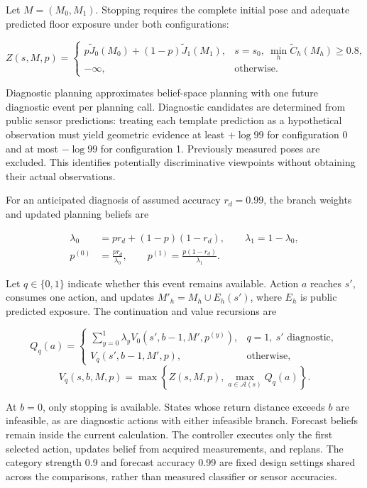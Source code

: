 \documentclass[11pt,a4paper]{article}
\begin{document}
Let \(M=(M_0,M_1)\). Stopping requires the complete initial pose and adequate predicted floor exposure under both configurations:

\[
Z(s,M,p)=
\begin{cases}
p\widetilde J_0(M_0)+(1-p)\widetilde J_1(M_1),
&s=s_0,\ \min_h\widetilde C_h(M_h)\ge0.8,\\
-\infty,&\text{otherwise}.
\end{cases}
\]

Diagnostic planning approximates belief-space planning \cite{ref12,ref13} with one future diagnostic event per planning call. Diagnostic candidates are determined from public sensor predictions: treating each template prediction as a hypothetical observation must yield geometric evidence at least \(+\log99\) for configuration 0 and at most \(-\log99\) for configuration 1. Previously measured poses are excluded. This identifies potentially discriminative viewpoints without obtaining their actual observations.

For an anticipated diagnosis of assumed accuracy \(r_d=0.99\), the branch weights and updated planning beliefs are

\[
\begin{aligned}
\lambda_0&=pr_d+(1-p)(1-r_d),\qquad \lambda_1=1-\lambda_0,\\
p^{(0)}&=\frac{pr_d}{\lambda_0},\qquad
p^{(1)}=\frac{p(1-r_d)}{\lambda_1}.
\end{aligned}
\]

Let \(q\in\{0,1\}\) indicate whether this event remains available. Action \(a\) reaches \(s'\), consumes one action, and updates \(M'_h=M_h\cup E_h(s')\), where \(E_h\) is public predicted exposure. The continuation and value recursions are

\[
Q_q(a)=
\begin{cases}
\sum_{y=0}^{1}\lambda_y V_0(s',b-1,M',p^{(y)}),
&q=1,\ s'\text{ diagnostic},\\
V_q(s',b-1,M',p),&\text{otherwise},
\end{cases}
\] \[
V_q(s,b,M,p)=\max\left\{Z(s,M,p),\max_{a\in\mathcal A(s)}Q_q(a)\right\}.
\]

At \(b=0\), only stopping is available. States whose return distance exceeds \(b\) are infeasible, as are diagnostic actions with either infeasible branch. Forecast beliefs remain inside the current calculation. The controller executes only the first selected action, updates belief from acquired measurements, and replans. The category strength 0.9 and forecast accuracy 0.99 are fixed design settings shared across the comparisons, rather than measured classifier or sensor accuracies.
\end{document}
